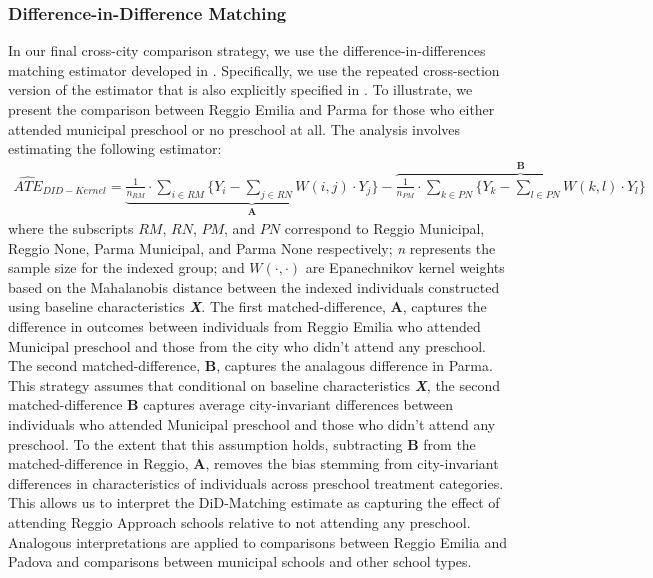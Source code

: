 \subsubsection{Difference-in-Difference Matching} \label{subsubsection:matchedDID}
In our final cross-city comparison strategy, we use the difference-in-differences matching estimator developed in \cite{Heckman_Ichimura_etal_1998_Econometrica}. Specifically, we use the repeated cross-section version of the estimator that is also explicitly specified in \cite{Smith_Todd_2005_JOE}. To illustrate, we present the comparison between Reggio Emilia and Parma for those who either attended municipal preschool or no preschool at all. The analysis involves estimating the following estimator:
\begin{align} \label{eq:kernelDID}
\widehat{ATE}_{DID-Kernel} = \underbrace{\frac{1}{n_{RM}} \cdot \sum_{i \in RM} \bigg\{ Y_i - \sum_{j \in RN} W(i,j) \cdot Y_j \bigg\}}_{\textbf{A}} - \overbrace{\frac{1}{n_{PM}} \cdot \sum_{k \in PN} \bigg\{ Y_k - \sum_{l \in PN} W(k,l) \cdot Y_l \bigg\}}^{\textbf{B}}
\end{align}
where the subscripts $RM$, $RN$, $PM$, and $PN$ correspond to Reggio Municipal, Reggio None, Parma Municipal, and Parma None respectively; \textit{n} represents the sample size for the indexed group; and $W(\cdot,\cdot)$ are Epanechnikov kernel weights based on the Mahalanobis distance between the indexed individuals constructed using baseline characteristics \textbf{\textit{X}}. The first matched-difference, \textbf{A}, captures the difference in outcomes between individuals from Reggio Emilia who attended Municipal preschool and those from the city who didn't attend any preschool. The second matched-difference, \textbf{B}, captures the analagous difference in Parma. This strategy assumes that conditional on baseline characteristics \textbf{\textit{X}}, the second matched-difference \textbf{B} captures average city-invariant differences between individuals who attended Municipal preschool and those who didn't attend any preschool. To the extent that this assumption holds, subtracting \textbf{B} from the matched-difference in Reggio, \textbf{A}, removes the bias stemming from city-invariant differences in characteristics of individuals across preschool treatment categories. This allows us to interpret the DiD-Matching estimate as capturing the effect of attending Reggio Approach schools relative to not attending any preschool. Analogous interpretations are applied to comparisons between Reggio Emilia and Padova and comparisons between municipal schools and other school types.
